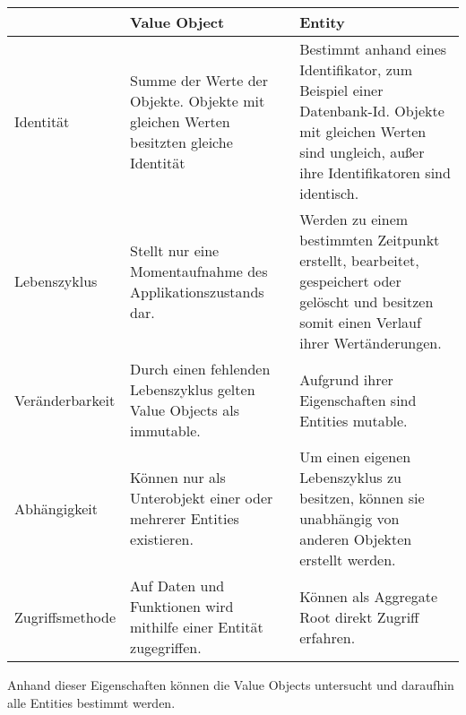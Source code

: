 {
\begin{table}
	\centering
	\begin{tabular}{ | p{} | p{} | p{} | } 
		\hline
		& {\textbf{\centering Value Object} } & \textbf{\centering Entity} \\ 
		\hline
		
		Identität & 
		Summe der Werte der Objekte. Objekte mit gleichen Werten besitzten gleiche Identität & 
		Bestimmt anhand eines Identifikator, zum Beispiel einer Datenbank-Id. Objekte mit gleichen Werten sind ungleich, außer ihre Identifikatoren sind identisch. \\ 
		\hline
		Lebenszyklus & 
		Stellt nur eine Momentaufnahme des Applikationszustands dar. &
		Werden zu einem bestimmten Zeitpunkt erstellt, bearbeitet, gespeichert oder gelöscht und besitzen somit einen Verlauf ihrer Wertänderungen.  \\ 
		\hline
		Veränderbarkeit & 
		Durch einen fehlenden Lebenszyklus gelten Value Objects als immutable. &
		Aufgrund ihrer Eigenschaften sind Entities mutable.  \\ 
		\hline
		Abhängigkeit & 
		Können nur als Unterobjekt einer oder mehrerer Entities existieren. &
		Um einen eigenen Lebenszyklus zu besitzen, können sie unabhängig von anderen Objekten erstellt werden.  \\ 
		\hline
		Zugriffsmethode & 
		Auf Daten und Funktionen wird mithilfe einer Entität zugegriffen. &
		Können als Aggregate Root direkt Zugriff erfahren. \\ 
		\hline
	\end{tabular}
\end{table}

}

Anhand dieser Eigenschaften können die Value Objects untersucht und daraufhin alle Entities bestimmt werden.


